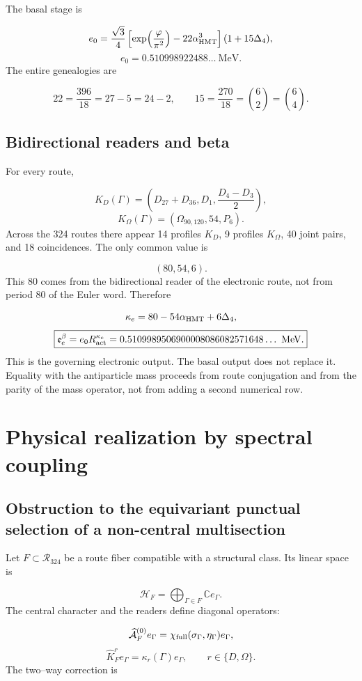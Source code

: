 The basal stage is

\[
 e_0=\frac{\sqrt3}{4}
 \left[\exp\!\left(\frac{\varphi}{\pi^2}\right)
 -22\alpha_{\rm HMT}^3\right](1+15\Delta_4),
\]
\[
 e_0=0.510998922488\ldots\ \mathrm{MeV}.
\]
The entire genealogies are

\[
 22=\frac{396}{18}=27-5=24-2,
 \qquad
 15=\frac{270}{18}=\binom62=\binom64.
\]
\subsection{Bidirectional readers and beta}
For every route,

\[
 K_D(\Gamma)=\left(D_{27}+D_{36},D_1,\frac{D_4-D_3}{2}\right),
\]
\[
 K_\Omega(\Gamma)=(\Omega_{90,120},54,P_6).
\]
Across the 324 routes there appear 14 profiles \(K_D\), 9 profiles \(K_\Omega\), 40 joint pairs, and 18 coincidences. The only common value is

\[
 (80,54,6).
\]
This 80 comes from the bidirectional reader of the electronic route, not from period 80 of the Euler word. Therefore

\[
 \kappa_e=80-54\alpha_{\rm HMT}+6\Delta_4,
\]
\[
 \boxed{
 \mathfrak e_e^\beta=e_0R_{\rm act}^{\kappa_e}
 =0.5109989506900008086082571648\ldots\ \mathrm{MeV}.}
\]
This is the governing electronic output. The basal output does not replace it. Equality with the antiparticle mass proceeds from route conjugation and from the parity of the mass operator, not from adding a second numerical row.

\section{Physical realization by spectral coupling}
\subsection{Obstruction to the equivariant punctual selection of a non-central multisection}
Let \(F\subset\mathcal R_{324}\) be a route fiber compatible with a structural class. Its linear space is

\[
 \mathcal H_F=\bigoplus_{\Gamma\in F}\mathbb C e_\Gamma.
\]
The central character and the readers define diagonal operators:

\[
 \widehat{\mathcal A}_F^{(0)}e_\Gamma
 =\chi_{\rm full}(\sigma_\Gamma,\eta_\Gamma)e_\Gamma,
\]
\[
 \widehat K_F^r e_\Gamma=\kappa_r(\Gamma)e_\Gamma,
 \qquad r\in\{D,\Omega\}.
\]
The two--way correction is

